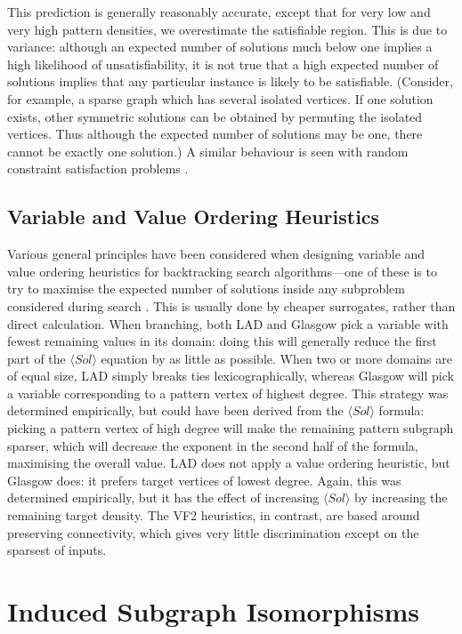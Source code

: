 \documentclass[letterpaper]{article}
\newcommand{\citep}[1]{\cite{#1}}
\begin{document}
This prediction is generally reasonably accurate, except that for very low and very high pattern
densities, we overestimate the satisfiable region. This is due to variance: although an expected
number of solutions much below one implies a high likelihood of unsatisfiability, it is not true
that a high expected number of solutions implies that any particular instance is likely to be
satisfiable. (Consider, for example, a sparse graph which has several isolated vertices. If one
solution exists, other symmetric solutions can be obtained by permuting the isolated vertices.
Thus although the expected number of solutions may be one, there cannot be exactly one solution.) A
similar behaviour is seen with random constraint satisfaction problems
\citep{Smith:1994,Smith:1996}.

\subsection{Variable and Value Ordering Heuristics}

Various general principles have been considered when designing variable and value ordering
heuristics for backtracking search algorithms---one of these is to try to maximise the expected
number of solutions inside any subproblem considered during search \citep{Gent:1996:EN}.  This is
usually done by cheaper surrogates, rather than direct calculation. When branching, both LAD and
Glasgow pick a variable with fewest remaining values in its domain: doing this will generally reduce
the first part of the $\langle Sol \rangle$ equation by as little as possible. When two or more
domains are of equal size, LAD simply breaks ties lexicographically, whereas Glasgow will pick a
variable corresponding to a pattern vertex of highest degree. This strategy was determined
empirically, but could have been derived from the $\langle Sol \rangle$ formula: picking a pattern
vertex of high degree will make the remaining pattern subgraph sparser, which will decrease the
exponent in the second half of the formula, maximising the overall value. LAD does not apply a value
ordering heuristic, but Glasgow does: it prefers target vertices of lowest degree.  Again, this was
determined empirically, but it has the effect of increasing $\langle Sol \rangle$ by increasing the
remaining target density. The VF2 heuristics, in contrast, are based around preserving connectivity,
which gives very little discrimination except on the sparsest of inputs.

\section{Induced Subgraph Isomorphisms}
\end{document}
